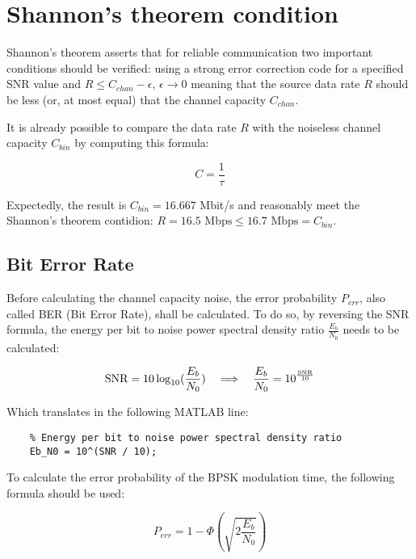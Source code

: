 \vspace{40px} \section{Shannon's theorem condition}
Shannon's theorem asserts that for reliable communication two important conditions should be verified: using a strong error correction code for a specified SNR value and $R \leq C_{chan} - \epsilon,\, \epsilon\to0$ meaning that the source data rate $R$ should be less (or, at most equal) that the channel capacity $C_{chan}$.

It is already possible to compare the data rate $R$ with the noiseless channel capacity $C_{bin}$ by computing this formula:

\begin{equation*}
    C = \frac{1}{\tau}
\end{equation*}

\noindent Expectedly, the result is $C_{bin} = 16.667$ Mbit/s and reasonably meet the Shannon's theorem contidion: $ R = 16.5 \text{ Mbps} \leq 16.7 \text{ Mbps} = C_{bin}$.


\subsection{Bit Error Rate}
Before calculating the channel capacity noise, the error probability $P_{err}$, also called BER (Bit Error Rate), shall be calculated. To do so, by reversing the SNR formula, the energy per bit to noise power spectral density ratio $\frac{E_b}{N_0}$ needs to be calculated:

\begin{equation*}
    \text{SNR} = 10\log_{10}(\frac{E_b}{N_0}) \hspace{10px} \Longrightarrow \hspace{10px} \frac{E_b}{N_0} = 10^{\frac{\text{SNR}}{10}}
\end{equation*}

\noindent Which translates in the following MATLAB line:

\begin{lstlisting}
    % Energy per bit to noise power spectral density ratio
    Eb_N0 = 10^(SNR / 10);
\end{lstlisting}

\noindent To calculate the error probability of the BPSK modulation time, the following formula should be used:

\begin{equation*}
    P_{err} = 1-\Phi\left( \sqrt{2\frac{E_b}{N_0}} \right)
\end{equation*}

